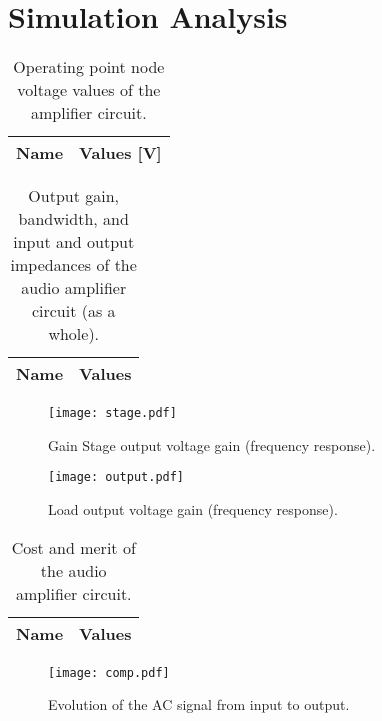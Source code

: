 \newpage
\section{Simulation Analysis}
\label{sec:simulation}

\begin{table}[h]
  \centering
  \begin{tabular}{|l|r|}
    \hline    
    {\bf Name} & {\bf Values [V]} \\ \hline
     
  \end{tabular}
  \caption{Operating point node voltage values of the amplifier circuit.}
  \label{tab:operator}
\end{table}

\begin{table}[h]
  \centering
  \begin{tabular}{|l|r|}
    \hline    
    {\bf Name} & {\bf Values} \\ \hline
    
         
  \end{tabular}
  \caption{Output gain, bandwidth, and input and output impedances of the audio amplifier circuit (as a whole).}
  \label{tab:main}
\end{table}

\begin{figure}[!h] \centering
\texttt{[image: stage.pdf]}
\caption{Gain Stage output voltage gain (frequency response).}
\label{fig:gainstage}
\end{figure}

\begin{figure}[!h] \centering
\texttt{[image: output.pdf]}
\caption{Load output voltage gain (frequency response).}
\label{fig:outputstage}
\end{figure}

\begin{table}[h]
  \centering
  \begin{tabular}{|l|r|}
    \hline    
    {\bf Name} & {\bf Values} \\ \hline
     
  \end{tabular}
  \caption{Cost and merit of the audio amplifier circuit.}
  \label{tab:merit}
\end{table}

\begin{figure}[!h] \centering
\texttt{[image: comp.pdf]}
\caption{Evolution of the AC signal from input to output.}
\label{fig:comp}
\end{figure}

